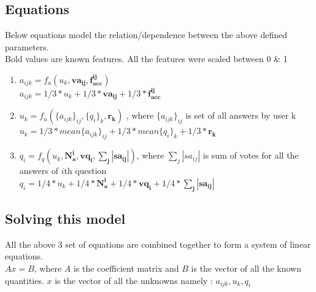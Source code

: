 \documentclass{article}
\begin{document}
\subsection{Equations}
Below equations model the relation/dependence between
the above defined parameters. \\
Bold values are known features.
All the features were scaled between 0 \& 1 \\
\begin{enumerate}
    \item $a_{ijk} = f_a(u_k, \mathbf{va_{ij}}, \mathbf{f_{acc}^{ij}})$ \\
        $a_{ijk} = 1/3*u_k + 1/3*\mathbf{va_{ij}} + 1/3*\mathbf{f_{acc}^{ij}}$
    \item $u_k = f_u(\{a_{ijk}\}_{ij}, \{q_i\}_k, \mathbf{r_k})$ , where $\{a_{ijk}\}_{ij}$
        is set of all answers by user k\\
        $u_k = 1/3*mean\{a_{ijk}\}_{ij} + 1/3*mean\{q_i\}_k + 1/3*\mathbf{r_k}$
    \item $q_i = f_q(u_k, \mathbf{N_{a}^{i}}, \mathbf{vq_i}, \mathbf{\sum_{j} |sa_{ij}|})$, where $\sum_{j} |sa_{ij}|$
        is sum of votes for all the answers of $i$th question \\
        $q_i = 1/4*u_k + 1/4*\mathbf{N_{a}^{i}}+ 1/4* \mathbf{vq_i} + 1/4*\mathbf{\sum_{j} |sa_{ij}|}$
\end{enumerate}

\subsection{Solving this model}
All the above 3 set of equations are combined together to form a system of linear
equations. \\
$Ax = B$, where $A$ is the coefficient matrix and $B$ is the vector of all the 
known quantities. $x$ is the vector of all the unknowns namely : $a_{ijk}, u_k, q_i$
\end{document}
